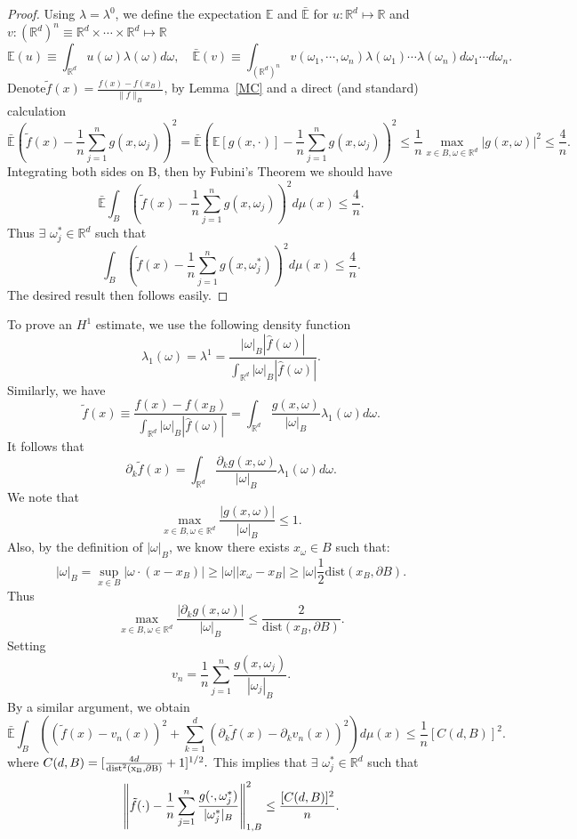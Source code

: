 \begin{proof}
	Using $\lambda=\lambda^0$, we define the expectation $\mathbb E$ and
	$\mathbb{\bar E}$ for $u: \mathbb R^d\mapsto \mathbb R$ and
	$v: (\mathbb R^d)^n\equiv\mathbb R^d\times\cdots\times\mathbb R^d\mapsto \mathbb R$
	$$
	\mathbb E(u)\equiv\int_{\mathbb R^d}u(\omega)\lambda(\omega)d\omega,  \quad
	\mathbb{\bar E}(v)\equiv\int_{(\mathbb
		R^d)^n}v(\omega_1,\cdots,\omega_n)
	\lambda(\omega_1)\cdots\lambda(\omega_n)d\omega_1\cdots d\omega_n .
	$$
	Denote$\tilde f(x)=\frac{f(x)-f(x_B)}{\|f\|_{B}}$, by
	Lemma~\ref{MC} and a direct (and standard) calculation
	$$
	\mathbb{\bar E}(\tilde f(x)-\frac1n\sum_{j=1}^ng(x,\omega_j))^2 
	=\mathbb{\bar E}(\mathbb{E}[g(x,\cdot)]-
	\frac1n\sum_{j=1}^n g(x,\omega_j))^2 
	\le\frac{1}{n}\max_{x\in B, \omega\in \mathbb R^d}|g(x,\omega)|^2
	\le \frac{4}{n}.
	$$
	Integrating both sides on B, then by Fubini's Theorem we should have
	$$
	\mathbb{\bar E}\int_B(\tilde f(x)-\frac1n\sum_{j=1}^ng(x,\omega_j))^2 d\mu(x)
	\le \frac{4}{n}.
	$$
	Thus $\exists$ $ \omega_j^*\in \mathbb{R}^d$ such that 
	$$
	\int_B  (\tilde f(x)-\frac1n\sum_{j=1}^ng(x,\omega_j^*))^2d\mu(x)\le \frac{4}{n}.
	$$
	The desired result then follows easily. 
\end{proof}
To prove an $H^1$ estimate, we use the following density function
$$
\lambda_1(\omega)=\lambda^1=\frac{|\omega|_B|\hat f(\omega)|}{\int_{\mathbb R^d}|\omega|_B|\hat f(\omega)|}.
$$
Similarly, we have
$$
\tilde f(x)\equiv \frac{f(x)-f(x_B)}{\int_{\mathbb R^d}|\omega|_B|\hat f(\omega)|}
=
\int_{\mathbb{R}^d}\frac{g(x,\omega)}{|\omega|_B}\lambda_1(\omega)d\omega.
$$
It follows that
$$
\partial_k\tilde f(x)
=
\int_{\mathbb{R}^d}\frac{\partial_kg(x,\omega)}{|\omega|_B}\lambda_1(\omega)d\omega.
$$
We note that
$$
\max_{x\in B, \omega\in \mathbb R^d}
\frac{|g(x,\omega)|}{|\omega|_B}\le 1.
$$
Also, by the definition of $|\omega|_B$, we know there exists $x_\omega\in B$ such that:
$$
|\omega|_B=\sup\limits_{x\in B}|\omega\cdot(x-x_B)|\ge|\omega||x_\omega-x_B|\ge|\omega|\frac12\mathrm{dist}(x_B,\partial B).
$$
Thus
$$
\max_{x\in B, \omega\in \mathbb R^d}
\frac{|\partial_kg(x,\omega)|}{|\omega|_B}\le \frac{2}{\mathrm{dist}(x_B,\partial B)}.
$$
Setting
$$
v_n=\frac1n\sum_{j=1}^n\frac{g(x,\omega_j)}{|\omega_j|_B}.
$$
By a similar argument, we obtain
$$
\mathbb{\bar E}
\int_B\left((\tilde f(x)-v_n(x))^2
+\sum_{k=1}^d (\partial_k\tilde f(x)-\partial_kv_n(x))^2
\right) d\mu(x)
\le \frac{1}{n}[C(d,B)]^2 .
$$
where
$
C(d,B)=[\frac{4d}{{\rm{dist}^2(x_B,\partial B)}}+1]^{1/2}.
$
This implies that $\exists$ $ \omega_j^*\in \mathbb{R}^d$ such that  
$$
\left\|\tilde f(\cdot)-{1\over n}\sum_{j=1}^n\frac{g(\cdot,\omega_j^*)}{|\omega_j^*|_B}\right\|_{1,B}^2
\le \frac{[C(d,B)]^2}{n}.
$$
